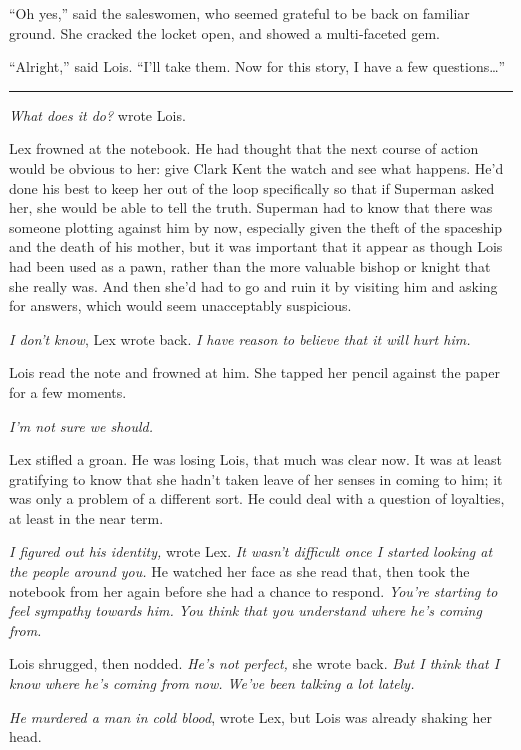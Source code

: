 ``Oh yes,'' said the saleswomen, who seemed grateful to be back on
familiar ground. She cracked the locket open, and showed a multi‐faceted
gem.

``Alright,'' said Lois. ``I'll take them. Now for this story, I have a
few questions\ldots{}''

\begin{center}\rule{0.5\linewidth}{\linethickness}\end{center}

\emph{What does it do?} wrote Lois.

Lex frowned at the notebook. He had thought that the next course of
action would be obvious to her: give Clark Kent the watch and see what
happens. He'd done his best to keep her out of the loop specifically so
that if Superman asked her, she would be able to tell the truth.
Superman had to know that there was someone plotting against him by now,
especially given the theft of the spaceship and the death of his mother,
but it was important that it appear as though Lois had been used as a
pawn, rather than the more valuable bishop or knight that she really
was. And then she'd had to go and ruin it by visiting him and asking for
answers, which would seem unacceptably suspicious.

\emph{I don't know}, Lex wrote back. \emph{I have reason to believe that
it will hurt him.}

Lois read the note and frowned at him. She tapped her pencil against the
paper for a few moments.

\emph{I'm not sure we should.}

Lex stifled a groan. He was losing Lois, that much was clear now. It was
at least gratifying to know that she hadn't taken leave of her senses in
coming to him; it was only a problem of a different sort. He could deal
with a question of loyalties, at least in the near term.

\emph{I figured out his identity,} wrote Lex. \emph{It wasn't difficult
once I started looking at the people around you.} He watched her face as
she read that, then took the notebook from her again before she had a
chance to respond. \emph{You're starting to feel sympathy towards him.
You think that you understand where he's coming from.}

Lois shrugged, then nodded. \emph{He's not perfect,} she wrote back.
\emph{But I think that I know where he's coming from now. We've been
talking a lot lately.}

\emph{He murdered a man in cold blood}, wrote Lex, but Lois was already
shaking her head.

